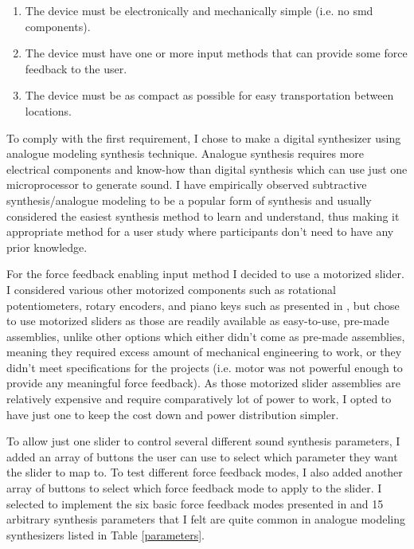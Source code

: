 \begin{enumerate}
	\item The device must be electronically and mechanically simple (i.e. no \gls{smd} components).
	\item The device must have one or more input methods that can provide some force feedback to the user.
	\item The device must be as compact as possible for easy transportation between locations.
\end{enumerate}

To comply with the first requirement, I chose to make a digital synthesizer using analogue modeling synthesis technique. Analogue synthesis requires more electrical components and know-how than digital synthesis which can use just one microprocessor to generate sound. I have empirically observed subtractive synthesis/analogue modeling to be a popular form of synthesis and usually considered the easiest synthesis method to learn and understand, thus making it appropriate method for a user study where participants don't need to have any prior knowledge.

For the force feedback enabling input method I decided to use a motorized slider. I considered various other motorized components such as rotational potentiometers, rotary encoders, and piano keys such as presented in \textcite{timmermans2020}, but chose to use motorized sliders as those are readily available as easy-to-use, pre-made assemblies, unlike other options which either didn't come as pre-made assemblies, meaning they required excess amount of mechanical engineering to work, or they didn't meet specifications for the projects (i.e. motor was not powerful enough to provide any meaningful force feedback). As those motorized slider assemblies are relatively expensive and require comparatively lot of power to work, I opted to have just one to keep the cost down and power distribution simpler.

To allow just one slider to control several different sound synthesis parameters, I added an array of buttons the user can use to select which parameter they want the slider to map to. To test different force feedback modes, I also added another array of buttons to select which force feedback mode to apply to the slider. I selected to implement the six basic force feedback modes presented in \textcite{kretz2004} and 15 arbitrary synthesis parameters that I felt are quite common in analogue modeling synthesizers listed in Table \ref{parameters}.

